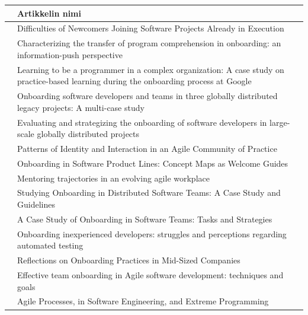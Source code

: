 \documentclass[utf8]{gradu3}
\begin{document}
\begin{table}\fontsize{10}{7.2}\selectfont
\begin{tabular}{p{3.5cm}p{12cm}}
        & Artikkelin nimi  \\
        \toprule
        \textcite{matturro-ym-2017} & Difficulties of Newcomers Joining Software Projects Already in Execution \\
        \midrule
        \textcite{yates-ym-2020} & Characterizing the transfer of program comprehension in onboarding: an information-push perspective\\
        \midrule
        \textcite{johnson-senges-2010} & Learning to be a programmer in a complex organization: A case study on practice-based learning during the onboarding process at Google\\
        \midrule
        \textcite{britto-ym-2017} & Onboarding software developers and teams in three globally distributed legacy projects: A multi-case study \\
        \midrule
        \textcite{britto-ym-2020} & Evaluating and strategizing the onboarding of software developers in large-scale globally distributed projects\\
        \midrule
        \textcite{kumar-wallace-2019} & Patterns of Identity and Interaction in an Agile Community of Practice \\
        \midrule
        \textcite{azanza-ym-2021} & Onboarding in Software Product Lines: Concept Maps as Welcome Guides \\
        \midrule
        \textcite{kumar-ym-2016} & Mentoring trajectories in an evolving agile workplace \\
        \midrule
        \textcite{moe-ym-2020} & Studying Onboarding in Distributed Software Teams: A Case Study and Guidelines \\
        \midrule
        \textcite{ju-ym-2021} & A Case Study of Onboarding in Software Teams: Tasks and Strategies \\
        \midrule
        \textcite{pham-ym-2017} & Onboarding inexperienced developers: struggles and perceptions regarding automated testing \\
        \midrule
        \textcite{viviani-murphy-2019} & Reflections on Onboarding Practices in Mid-Sized Companies \\
        \midrule
        \textcite{buchan-ym-2019} & Effective team onboarding in Agile software development: techniques and goals \\
        \midrule
        \textcite{shannon-pool-2016} & Agile Processes, in Software Engineering, and Extreme Programming \\

\end{tabular}
\end{table}
\end{document}
